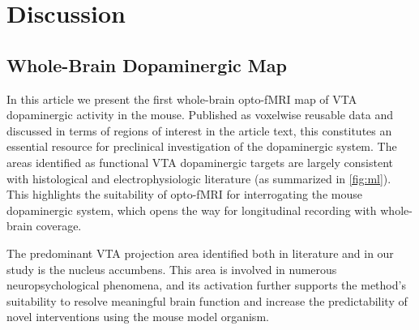 \section{Discussion}

\subsection{Whole-Brain Dopaminergic Map}

In this article we present the first whole-brain opto-fMRI map of VTA dopaminergic activity in the mouse.
Published as voxelwise reusable data and discussed in terms of regions of interest in the article text, this constitutes an essential resource for preclinical investigation of the dopaminergic system.
The areas identified as functional VTA dopaminergic targets are largely consistent with histological and electrophysiologic literature (as summarized in \cref{fig:ml}).
This highlights the suitability of opto-fMRI for interrogating the mouse dopaminergic system, which opens the way for longitudinal recording with whole-brain coverage.

The predominant VTA projection area identified both in literature and in our study is the nucleus accumbens.
This area is involved in numerous neuropsychological phenomena, and its activation further supports the method's suitability to resolve meaningful brain function and increase the predictability of novel interventions using the mouse model organism.


